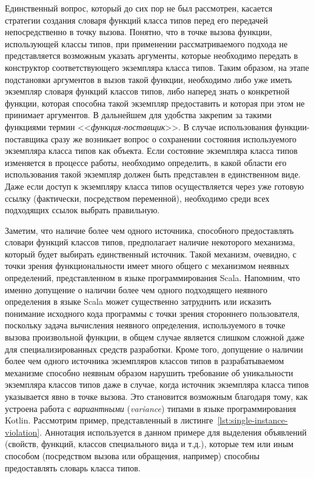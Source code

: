 Единственный вопрос, который до сих пор не был рассмотрен, касается стратегии создания словаря функций класса типов перед его передачей непосредственно в точку вызова. Понятно, что в точке вызова функции, использующей классы типов, при применении рассматриваемого подхода не представляется возможным указать аргументы, которые необходимо передать в конструктор соответствующего экземпляра класса типов. Таким образом, на этапе подстановки аргументов в вызов такой функции, необходимо либо уже иметь экземпляр словаря функций классов типов, либо наперед знать о конкретной функции, которая способна такой экземпляр предоставить и которая при этом не принимает аргументов. В дальнейшем для удобства закрепим за такими функциями термин <<\emph{функция-поставщик}>>. В случае использования функции-поставщика сразу же возникает вопрос о сохранении состояния используемого экземпляра класса типов как объекта. Если состояние экземпляра класса типов изменяется в процессе работы, необходимо определить, в какой области его использования такой экземпляр должен быть представлен в единственном виде. Даже если доступ к экземпляру класса типов осуществляется через уже готовую ссылку (фактически, посредством переменной), необходимо среди всех подходящих ссылок выбрать правильную.

Заметим, что наличие более чем одного источника, способного предоставлять словари функций классов типов, предполагает наличие некоторого механизма, который будет выбирать единственный источник. Такой механизм, очевидно, с точки зрения функциональности имеет много общего с механизмом неявных определений, представленном в языке программирования Scala. Напомним, что именно допущение о наличии более чем одного подходящего неявного определения в языке Scala может существенно затруднить или исказить понимание исходного кода программы с точки зрения стороннего пользователя, поскольку задача вычисления неявного определения, используемого в точке вызова произвольной функции, в общем случае является слишком сложной даже для специализированных средств разработки. Кроме того, допущение о наличии более чем одного источника экземпляров классов типов в разрабатываемом механизме способно неявным образом нарушить требование об уникальности экземпляра классов типов даже в случае, когда источник экземпляра класса типов указывается явно в точке вызова. Это становится возможным благодаря тому, как устроена работа с \emph{вариантными} (\emph{variance}) типами в языке программирования Kotlin. Рассмотрим пример, представленный в листинге~\ref{lst:single-instance-violation}. Аннотация  используется в данном примере для выделения объявлений (свойств, функций, классов специального вида и т.д.), которые тем или иным способом (посредством вызова или обращения, например) способны предоставлять словарь класса типов.  

